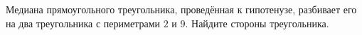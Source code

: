\begin{ex}
	\begin{condition}
		Медиана прямоугольного треугольника, проведённая к гипотенузе, разбивает его на два треугольника с периметрами \( 2 \) и \( 9 \). Найдите стороны треугольника.
	\end{condition}
\end{ex}
